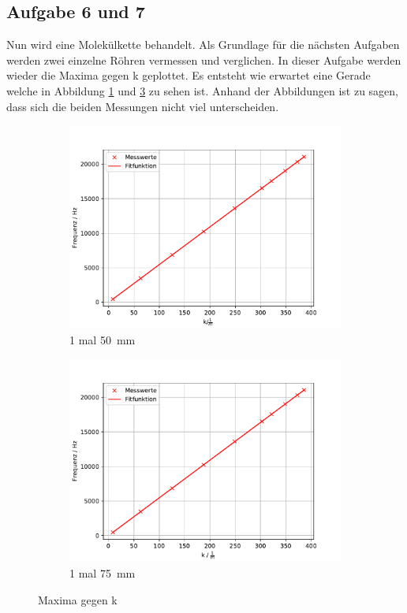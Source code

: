 \FloatBarrier

\subsection{Aufgabe 6 und 7}
Nun wird eine Molekülkette behandelt.
Als Grundlage für die nächsten Aufgaben werden zwei einzelne Röhren vermessen und verglichen.
In dieser Aufgabe werden wieder die Maxima gegen k geplottet. Es entsteht wie erwartet eine Gerade welche in Abbildung \ref{fig.Aufgabe6} und \ref{fig.Aufgabe7} zu sehen ist.
Anhand der Abbildungen ist zu sagen, dass sich die beiden Messungen nicht viel unterscheiden.

\begin{figure}
 \centering
 \begin{subfigure}{0.48\textwidth}
  \centering
  \includegraphics[width=1\textwidth]{A6.pdf}
  \caption{1 mal \SI{50}{mm}}
  \label{fig.Aufgabe6}
 \end{subfigure}
 \begin{subfigure}{0.48\textwidth}
  \centering
  \includegraphics[width=1\textwidth]{A7.pdf}
  \caption{1 mal \SI{75}{mm}}
  \label{fig.Aufgabe7}
 \end{subfigure}
 \caption{Maxima gegen k}
\end{figure}
\FloatBarrier

